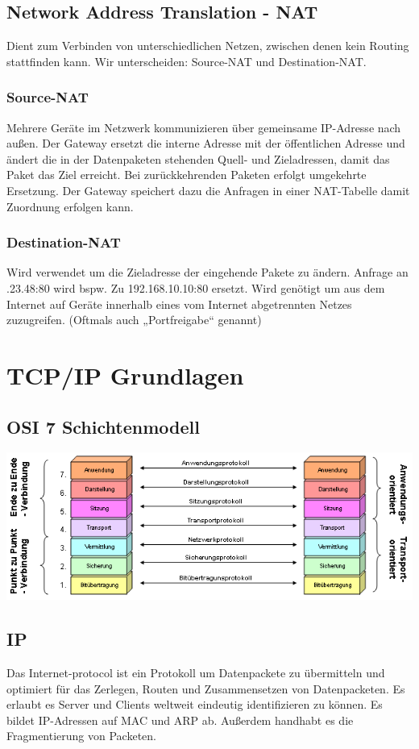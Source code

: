 \documentclass[12pt,a4paper]{article}
\begin{document}
\subsection{Network Address Translation - NAT}
Dient zum Verbinden von unterschiedlichen Netzen, zwischen denen kein Routing stattfinden kann. Wir unterscheiden: Source-NAT und Destination-NAT.

\subsubsection{Source-NAT}
Mehrere Geräte im Netzwerk kommunizieren über gemeinsame IP-Adresse nach außen. Der Gateway ersetzt die interne Adresse mit der öffentlichen Adresse und ändert die in der Datenpaketen stehenden Quell- und Zieladressen, damit das Paket das Ziel erreicht. Bei zurückkehrenden Paketen erfolgt umgekehrte Ersetzung. Der Gateway speichert dazu die Anfragen in einer NAT-Tabelle damit Zuordnung erfolgen kann.

\subsubsection{Destination-NAT}
Wird verwendet um die Zieladresse der eingehende Pakete zu ändern. Anfrage an .23.48:80 wird bspw. Zu 192.168.10.10:80 ersetzt. Wird genötigt um aus dem Internet auf Geräte innerhalb eines vom Internet abgetrennten Netzes zuzugreifen. (Oftmals auch „Portfreigabe“ genannt)

\section{TCP/IP Grundlagen}
\subsection{OSI 7 Schichtenmodell}
\includegraphics[width=\textwidth]{Bilder/OSI-Modell.png}

\subsection{IP}
Das Internet-protocol ist ein Protokoll um Datenpackete zu übermitteln und optimiert für das Zerlegen, Routen und Zusammensetzen von Datenpacketen. Es erlaubt es Server und Clients weltweit eindeutig identifizieren zu können. Es bildet IP-Adressen auf MAC und ARP ab. Außerdem handhabt es die Fragmentierung von Packeten.
\end{document}
